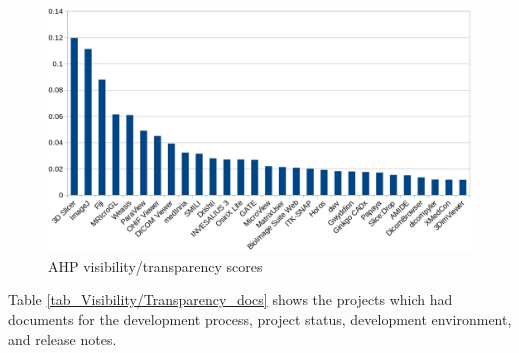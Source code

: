\begin{figure}[H]
\includegraphics[scale=0.38]{figures/visibility_transparency_scores.png}
\caption{AHP visibility/transparency scores}
\label{fg_visibility_transparency_scores}
\end{figure}

Table \ref{tab_Visibility/Transparency_docs} shows the projects which had documents for the development process, project status, development environment, and release notes.


